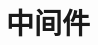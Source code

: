 \documentclass[../../interview-questions.tex]{subfiles}
\begin{document}
\section{中间件}


\end{document}
